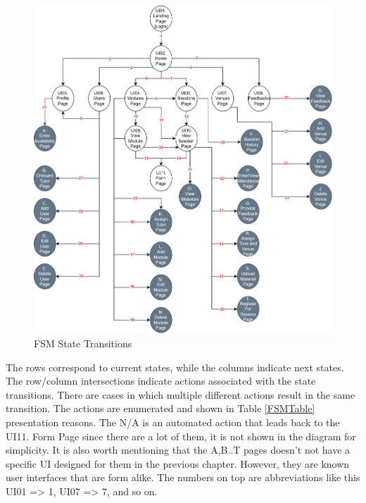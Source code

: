 \begin{justify}
    \begin{figure}[H]
        \centerline{\includegraphics[width=150mm,scale=1]{figures/implementation_and_testing/testing/FSM/FSM.png}}
        \caption{FSM State Transitions}
        \label{FSM}
    \end{figure}
    
    \vspace{-0.5cm}
    \noindent The rows correspond to current states, while the columns indicate next states. The
    row/column intersections indicate actions associated with the state transitions. There are
    cases in which multiple different actions result in the same transition. The actions are enumerated and shown in Table \ref{FSMTable} presentation reasons. The N/A is an automated action that leads back to the UI11. Form Page since there are a lot of them, it is not shown in the diagram for simplicity. It is also worth mentioning that the A,B..T pages doesn't not have a specific UI designed for them in the previous chapter. However, they are known user interfaces that are form alike. The numbers on top are abbreviations like this UI01 => 1, UI07 => 7, and so on.


\end{justify}

